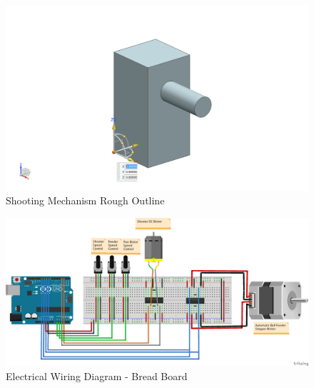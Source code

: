 \documentclass[11pt]{article}
\begin{document}
\begin{figure}[H]
   \centering
   \includegraphics[width=1\textwidth]{img/Shooting_Mechanism.png} %
   \caption{Shooting Mechanism Rough Outline}
   \label{fig:shootingmechanismoutline}
\end{figure}

\begin{figure}[H]
   \centering
   \includegraphics[width=1\textwidth]{img/Electrical_Wiring_Diagram_bb.png} %
   \caption{Electrical Wiring Diagram - Bread Board}
   \label{fig:electricalwiringdiagrambb}
\end{figure}
\end{document}
